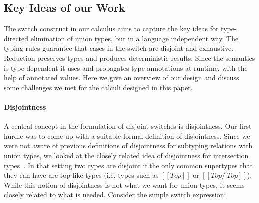\begin{comment}
\paragraph{Existing problems in Ceylon}
In general, a term of type $A$ is always assignable to any supertype of $A$.
But in Ceylon, the checking of assignability is not complete to
subtyping.
Although the subtyping relation holds between \lstinline{v}'s
(declarative) type and \lstinline{Integer}, \lstinline{v}
is not assignable to \lstinline{Integer}, and the following program
cannot be accepted by Ceylon's compiler.

\begin{lstlisting}
	< Character | Integer > & < String | Integer > v = 100;
	switch (v)
	case (is Integer) { print("Integer: ``v``"); }
\end{lstlisting}
\end{comment}


\subsection{Key Ideas of our Work}
The switch construct in our calculus \cal aims to capture the key ideas for
type-directed elimination of union types, but in a language independent way.
The typing rules guarantee that cases in the switch are disjoint and exhaustive.
Reduction preserves types and produces deterministic results. Since the semantics
is type-dependent it uses and propagates type annotations at runtime,
with the help of annotated values.
Here we give an overview of our design and discuss some challenges
we met for the calculi designed in this paper.

\paragraph{Disjointness}
A central concept in the formulation of disjoint switches is disjointness.
Our first hurdle was to come up with a suitable formal definition of disjointness.
Since we were not aware of previous definitions of disjointness
for subtyping relations with union types,
we looked at the closely related idea of disjointness for intersection
types~\cite{oliveira2016disjoint}. In that setting two types are disjoint
if the only common supertypes that they can have are top-like types (i.e.
types such as $[[Top]]$ or $[[Top /\ Top]]$). While this notion of
disjointness is not what we want for union types, it seems closely related
to what is needed. Consider the simple \cal switch expression:

